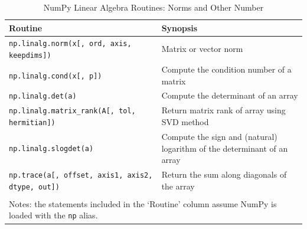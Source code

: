 \documentclass[a4paper,11pt]{book}
\begin{document}
\begin{table}
	\centering
	\caption{NumPy Linear Algebra Routines: Norms and Other Number}
	\label{tab:norms}
	\begin{tabular}{ll}
		\toprule \toprule
			Routine & Synopsis \\
			\midrule
                        \texttt{np.linalg.norm(x[, ord, axis, keepdims])} &
                        Matrix or vector norm\\
                        \texttt{np.linalg.cond(x[, p])}&
                        Compute the condition number of a matrix\\
                        \texttt{np.linalg.det(a)}&
                        Compute the determinant of an array\\
                        \texttt{np.linalg.matrix\_rank(A[, tol, hermitian])}&
                        Return matrix rank of array using SVD method\\
                        \texttt{np.linalg.slogdet(a)}&
                        Compute the sign and (natural) logarithm of the determinant of an array\\
                        \texttt{np.trace(a[, offset, axis1, axis2, dtype, out])}&
                        Return the sum along diagonals of the array\\            
	     	\bottomrule \\[-1.8ex]
	        \multicolumn{2}{l}{Notes: the statements included in the `Routine' column assume NumPy is loaded with the \texttt{np} alias.} \\
	\end{tabular}
\end{table} 
\end{document}
